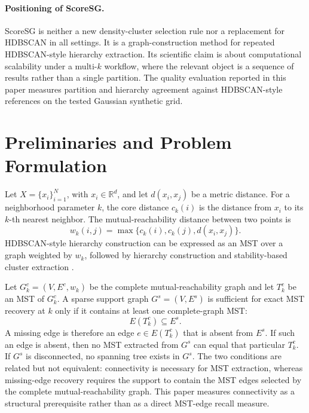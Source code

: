 \documentclass[11pt]{article}
\begin{document}
\paragraph{Positioning of ScoreSG.}
ScoreSG is neither a new density-cluster selection rule nor a replacement for HDBSCAN in all settings. It is a graph-construction method for repeated HDBSCAN-style hierarchy extraction. Its scientific claim is about computational scalability under a multi-\(k\) workflow, where the relevant object is a sequence of results rather than a single partition. The quality evaluation reported in this paper measures partition and hierarchy agreement against HDBSCAN-style references on the tested Gaussian synthetic grid.

\section{Preliminaries and Problem Formulation}
\label{sec:preliminaries}

Let \(X=\{x_i\}_{i=1}^{N}\), with \(x_i \in \mathbb{R}^{d}\), and let \(d(x_i,x_j)\) be a metric distance. For a neighborhood parameter \(k\), the core distance \(c_k(i)\) is the distance from \(x_i\) to its \(k\)-th nearest neighbor. The mutual-reachability distance between two points is
\begin{equation}
  w_k(i,j) = \max\{c_k(i), c_k(j), d(x_i,x_j)\}.
\end{equation}
HDBSCAN-style hierarchy construction can be expressed as an MST over a graph weighted by \(w_k\), followed by hierarchy construction and stability-based cluster extraction \citep{campello2015hierarchical}.

Let \(G^c_k=(V,E^c,w_k)\) be the complete mutual-reachability graph and let \(T^c_k\) be an MST of \(G^c_k\). A sparse support graph \(G^s=(V,E^s)\) is sufficient for exact MST recovery at \(k\) only if it contains at least one complete-graph MST:
\begin{equation}
  E(T^c_k) \subseteq E^s.
\end{equation}
A missing edge is therefore an edge \(e \in E(T^c_k)\) that is absent from \(E^s\). If such an edge is absent, then no MST extracted from \(G^s\) can equal that particular \(T^c_k\). If \(G^s\) is disconnected, no spanning tree exists in \(G^s\). The two conditions are related but not equivalent: connectivity is necessary for MST extraction, whereas missing-edge recovery requires the support to contain the MST edges selected by the complete mutual-reachability graph. This paper measures connectivity as a structural prerequisite rather than as a direct MST-edge recall measure.
\end{document}
